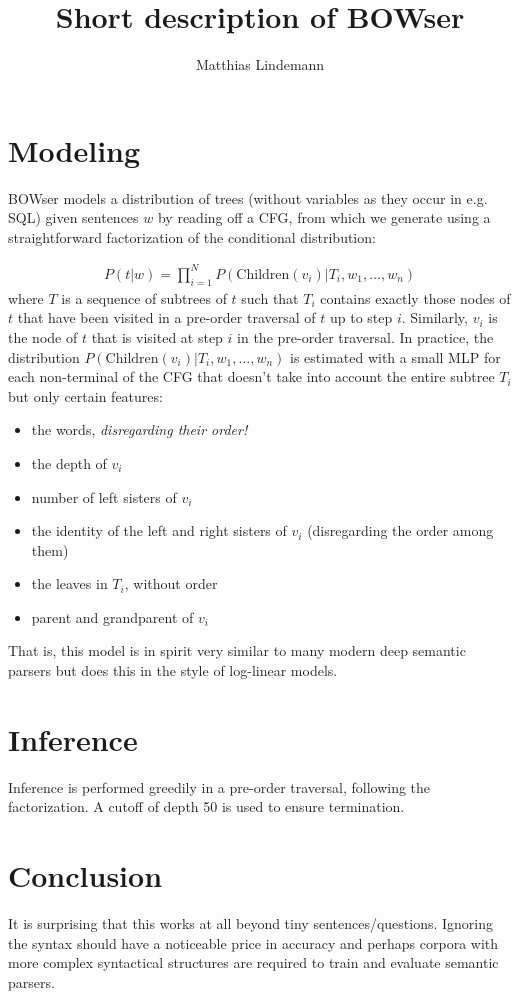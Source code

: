 \documentclass{article}
\begin{document}
	\title{Short description of BOWser}
	\author{Matthias Lindemann}
	\maketitle
	
	\section{Modeling}
	
	BOWser models a distribution of trees (without variables as they occur in e.g. SQL) given sentences $w$ by reading off a CFG, from which we generate using a straightforward factorization of the conditional distribution:
	
	\begin{align*}
		P(t|w) = \prod_{i=1}^N P(\text{Children}(v_i)|T_i, w_1, \ldots, w_n)
	\end{align*}
	where $T$ is a sequence of subtrees of $t$ such that $T_i$ contains exactly those nodes of $t$ that have been visited in a pre-order traversal of $t$ up to step $i$. Similarly, $v_i$ is the node of $t$ that is visited at step $i$ in the pre-order traversal. In practice, the distribution $P(\text{Children}(v_i)|T_i, w_1, \ldots, w_n)$ is estimated with a small MLP for each non-terminal of the CFG that doesn't take into account the entire subtree $T_i$ but only certain features:
	
	\begin{itemize}
		\item the words, \textit{disregarding their order!}
		\item the depth of $v_i$
		\item number of left sisters of $v_i$
		\item the identity of the left and right sisters of $v_i$ (disregarding the order among them)
		\item the leaves in $T_i$, without order
		\item parent and grandparent of $v_i$
	\end{itemize}

	That is, this model is in spirit very similar to many modern deep semantic parsers but does this in the style of log-linear models. 
	
	\section{Inference}
	Inference is performed greedily in a pre-order traversal, following the factorization. A cutoff of depth 50 is used to ensure termination.
	
	\section{Conclusion}
	It is surprising that this works at all beyond tiny sentences/questions. Ignoring the syntax should have a noticeable price in accuracy and perhaps corpora with more complex syntactical structures are required to train and evaluate semantic parsers.
	
\end{document}
